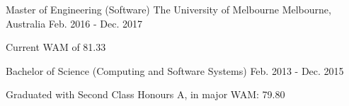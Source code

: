 \begin{cventries}
  \cventrydouble
    {Master of Engineering (Software)}
    {The University of Melbourne}
    {Melbourne, Australia}
    {Feb. 2016 - Dec. 2017}
    {
      \begin{cvitems}
        \item {Current WAM of 81.33}
      \end{cvitems}
    }
    {Bachelor of Science (Computing and Software Systems)}
    {Feb. 2013 - Dec. 2015}
    {
      \begin{cvitems}
        \item {Graduated with Second Class Honours A, in major WAM: 79.80}
      \end{cvitems}
    }
\end{cventries}
\vspace{-5mm}
